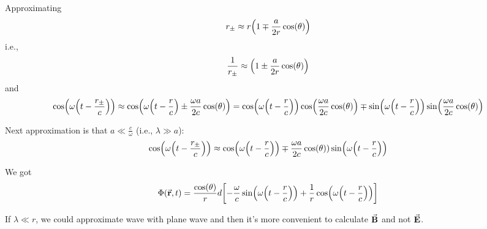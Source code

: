 Approximating
$$r_\pm \approx r\qty(1\mp \frac{a}{2r}\cos(\theta))$$
i.e.,
$$\frac{1}{r_\pm} \approx \qty(1\pm \frac{a}{2r}\cos(\theta))$$
and
$$\cos(\omega\qty(t-\frac{r_\pm}{c})) \approx \cos(\omega\qty(t-\frac{r}{c}) \pm \frac{\omega a}{2c}\cos(\theta)) = \cos(\omega\qty(t-\frac{r}{c}))\cos(\frac{\omega a}{2c}\cos(\theta)) \mp \sin(\omega\qty(t-\frac{r}{c}))\sin(\frac{\omega a}{2c}\cos(\theta))$$

Next approximation is that $a\ll \frac{c}{\omega}$ (i.e., $\lambda \gg a$):
$$\cos(\omega\qty(t-\frac{r_\pm}{c})) \approx \cos(\omega\qty(t-\frac{r}{c})) \mp \frac{\omega a}{2c} \cos(\theta)) \sin(\omega\qty(t-\frac{r}{c}))$$

We got
$$\Phi(\va{r},t) = \frac{\cos(\theta)}{r}d\qty[-\frac{\omega}{c} \sin(\omega\qty(t-\frac{r}{c})) +\frac{1}{r}\cos(\omega\qty(t-\frac{r}{c}))]$$

If $\lambda \ll r$, we could approximate wave with plane wave and then it's more convenient to calculate $\va{B}$ and not $\va{E}$. 